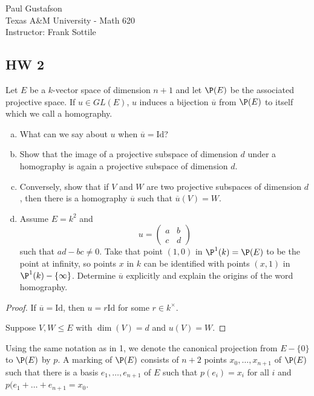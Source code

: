 \documentclass{article}
\begin{document}
\noindent Paul Gustafson\\
\noindent Texas A\&M University - Math 620\\ 
\noindent Instructor: Frank Sottile

\subsection*{HW 2}

 Let $E$ be a $k$-vector space of dimension $n + 1$ and let $\P(E)$ be the associated projective space. If $u \in GL(E)$, $u$ induces a bijection $\overline{u}$ from $\P(E)$ to itself which we call a homography.
\begin{enumerate}[a)]
\item What can we say about $u$ when $\overline u = \mathrm{Id}$?
\item Show that the image of a projective subspace of dimension $d$ under a homography is again a projective subspace of dimension $d$.
\item Conversely, show that if $V$ and $W$ are two projective subspaces of dimension $d$, then there is a homography $\overline u$ such that $\overline u (V) = W$.
\item Assume $E = k^2$ and 
$$ u = \begin{pmatrix}
a & b \\
c & d 
\end{pmatrix}
$$
such that $ad - bc \neq 0$.  Take that point $(1,0)$ in $\P^1(k) = \P(E)$ to be the point at infinity, so points $x$ in $k$ can be identified with points $(x,1)$ in $\P^1(k) - \{\infty\}$. Determine $\overline u$ explicitly and explain the origins of the word homography.
\end{enumerate}

\begin{proof}
If $\overline u = \mathrm{Id}$, then $u = r \mathrm{Id}$ for some $r \in k^\times$.

Suppose $V, W \le E$ with $\dim(V) = d$ and $u(V) = W$.  



\end{proof}


 Using the same notation as in 1, we denote the canonical projection from $E - \{0\}$ to $\P(E)$ by $p$. A marking of $\P(E)$ consists of $n + 2$ points $x_0, \ldots, x_{n+1}$ of $\P(E)$ such that there is a basis $e_1, \ldots, e_{n+1}$ of $E$ such that $p(e_i) = x_i$ for all $i$ and $p(e_1 + \ldots + e_{n+1} = x_0$.
\end{document}
